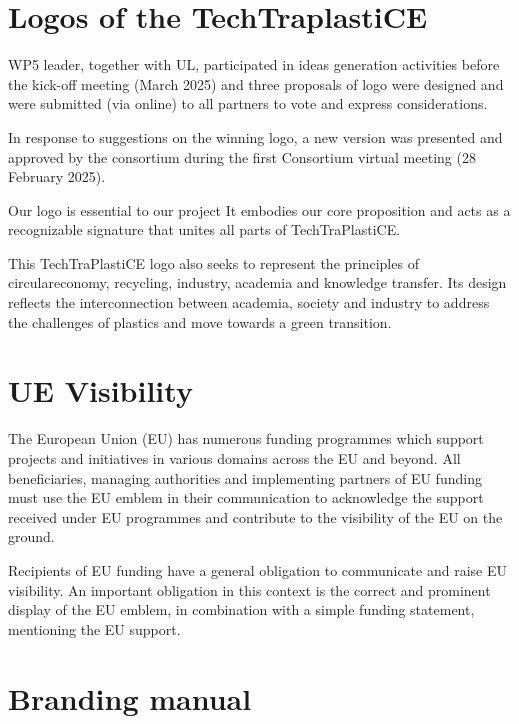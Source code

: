 \documentclass[
  12pt,
  oneside]{book}
\begin{document}
\newpage

\section{Logos of the
TechTraplastiCE}\label{logos-of-the-techtraplastice}

WP5 leader, together with UL, participated in ideas generation
activities before the kick-off meeting (March 2025) and three proposals
of logo were designed and were submitted (via online) to all partners to
vote and express considerations.

In response to suggestions on the winning logo, a new version was
presented and approved by the consortium during the first Consortium
virtual meeting (28 February 2025).

Our logo is essential to our project It embodies our core proposition
and acts as a recognizable signature that unites all parts of
TechTraPlastiCE.

This TechTraPlastiCE logo also seeks to represent the principles of
circulareconomy, recycling, industry, academia and knowledge transfer.
Its design reflects the interconnection between academia, society and
industry to address the challenges of plastics and move towards a green
transition.

\section{UE Visibility}\label{ue-visibility}

The European Union (EU) has numerous funding programmes which support
projects and initiatives in various domains across the EU and beyond.
All beneficiaries, managing authorities and implementing partners of EU
funding must use the EU emblem in their communication to acknowledge the
support received under EU programmes and contribute to the visibility of
the EU on the ground.

Recipients of EU funding have a general obligation to communicate and
raise EU visibility. An important obligation in this context is the
correct and prominent display of the EU emblem, in combination with a
simple funding statement, mentioning the EU support.



\section{Branding manual}\label{branding-manual}
\end{document}
